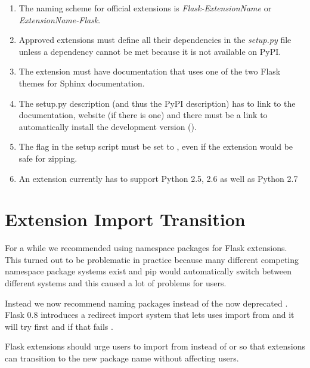 \documentclass[a4paper,12pt]{sphinxmanual}
\begin{document}
\begin{enumerate}
\item {} 
The naming scheme for official extensions is \emph{Flask-ExtensionName} or
\emph{ExtensionName-Flask}.

\item {} 
Approved extensions must define all their dependencies in the
\emph{setup.py} file unless a dependency cannot be met because it is not
available on PyPI.

\item {} 
The extension must have documentation that uses one of the two Flask
themes for Sphinx documentation.

\item {} 
The setup.py description (and thus the PyPI description) has to
link to the documentation, website (if there is one) and there
must be a link to automatically install the development version
().

\item {} 
The  flag in the setup script must be set to ,
even if the extension would be safe for zipping.

\item {} 
An extension currently has to support Python 2.5, 2.6 as well as
Python 2.7

\end{enumerate}


\section{Extension Import Transition}
\label{extensiondev:ext-import-transition}\label{extensiondev:extension-import-transition}
For a while we recommended using namespace packages for Flask extensions.
This turned out to be problematic in practice because many different
competing namespace package systems exist and pip would automatically
switch between different systems and this caused a lot of problems for
users.

Instead we now recommend naming packages  instead of the now
deprecated .  Flask 0.8 introduces a redirect import
system that lets uses import from  and it will try
 first and if that fails .

Flask extensions should urge users to import from 
instead of  or  so that extensions can
transition to the new package name without affecting users.
\end{document}
